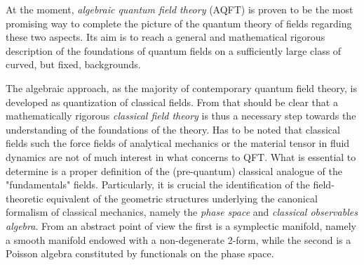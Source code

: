 \documentclass[Main]{subfiles}
\begin{document}
At the moment, \emph{algebraic quantum field theory} (AQFT) is proven to be the most promising way to complete the picture of the quantum theory of fields regarding these two aspects.
Its aim is to reach a general and mathematical rigorous description of the foundations of quantum fields on a  sufficiently large class of curved, but fixed, backgrounds.

The algebraic approach, as the majority of contemporary quantum field theory, is developed as quantization of classical fields.
From that should be clear that a mathematically rigorous \emph{classical field theory}  is thus a necessary step towards the understanding of the foundations of  the theory.
Has to be noted that classical fields such the force fields of analytical mechanics or the material tensor in fluid dynamics are not of much interest in what concerns to QFT. 
What is essential to determine is a proper definition of the (pre-quantum) classical analogue of the "fundamentals" fields.
Particularly, it is crucial the identification of the field-theoretic equivalent of the geometric structures underlying the canonical formalism of classical mechanics, namely the \emph{phase space} and \emph{classical observables algebra}. 
From an abstract point of view  the first is a symplectic manifold, namely a smooth manifold endowed with a non-degenerate 2-form, while the second is a Poisson algebra constituted by functionals on the phase space.
\end{document}
